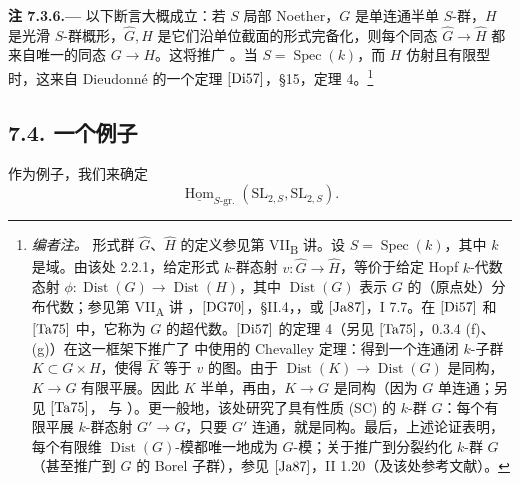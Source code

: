 \par\medskip\noindent{}\textbf{注 7.3.6.---}\enspace
以下断言大概成立：若 \(S\) 局部 Noether，\(G\) 是单连通半单 \(S\)-群，\(H\) 是光滑 \(S\)-群概形，\(\widehat G,\widehat H\) 是它们沿单位截面的形式完备化，则每个同态 \(\widehat G\to\widehat H\) 都来自唯一的同态 \(G\to H\)。这将推广 。当 \(S=\operatorname{Spec}(k)\)，而 \(H\) 仿射且有限型时，这来自 Dieudonné 的一个定理 \([{\rm Di57}]\)，\S15，定理 4。\footnote{\textit{编者注。} 形式群 \(\widehat G\)、\(\widehat H\) 的定义参见第 VII\textsubscript{B} 讲。设 \(S=\operatorname{Spec}(k)\)，其中 \(k\) 是域。由该处 2.2.1，给定形式 \(k\)-群态射 \(v:\widehat G\to\widehat H\)，等价于给定 Hopf \(k\)-代数态射 \(\phi:\operatorname{Dist}(G)\to\operatorname{Dist}(H)\)，其中 \(\operatorname{Dist}(G)\) 表示 \(G\) 的（原点处）分布代数；参见第 VII\textsubscript{A} 讲 ，\([{\rm DG70}]\)，\S II.4，，或 \([{\rm Ja87}]\)，I 7.7。在 \([{\rm Di57}]\) 和 \([{\rm Ta75}]\) 中，它称为 \(G\) 的超代数。\([{\rm Di57}]\) 的定理 4（另见 \([{\rm Ta75}]\)，0.3.4 (f)、(g)）在这一框架下推广了  中使用的 Chevalley 定理：得到一个连通闭 \(k\)-子群 \(K\subset G\times H\)，使得 \(\widehat K\) 等于 \(v\) 的图。由于 \(\operatorname{Dist}(K)\to\operatorname{Dist}(G)\) 是同构，\(K\to G\) 有限平展。因此 \(K\) 半单，再由，\(K\to G\) 是同构（因为 \(G\) 单连通；另见 \([{\rm Ta75}]\)， 与 ）。更一般地，该处研究了具有性质 \textup{(SC)} 的 \(k\)-群 \(G\)：每个有限平展 \(k\)-群态射 \(G'\to G\)，只要 \(G'\) 连通，就是同构。最后，上述论证表明，每个有限维 \(\operatorname{Dist}(G)\)-模都唯一地成为 \(G\)-模；关于推广到分裂约化 \(k\)-群 \(G\)（甚至推广到 \(G\) 的 Borel 子群），参见 \([{\rm Ja87}]\)，II 1.20（及该处参考文献）。}

\subsection*{7.4. 一个例子}
作为例子，我们来确定
\[
  \underline{\operatorname{Hom}}_{S\text{-}\mathrm{gr.}}
    (\mathrm{SL}_{2,S},\mathrm{SL}_{2,S}).
\]

